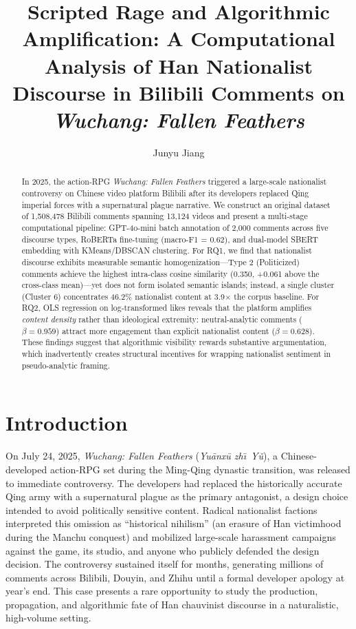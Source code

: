 \documentclass[letterpaper]{article}
\title{Scripted Rage and Algorithmic Amplification: A Computational Analysis of Han Nationalist Discourse in Bilibili Comments on \textit{Wuchang: Fallen Feathers}}
\author{
    Junyu Jiang
}
\begin{document}
\maketitle

\begin{abstract}
In 2025, the action-RPG \textit{Wuchang: Fallen Feathers} triggered a large-scale nationalist controversy on Chinese video platform Bilibili after its developers replaced Qing imperial forces with a supernatural plague narrative. We construct an original dataset of 1,508,478 Bilibili comments spanning 13,124 videos and present a multi-stage computational pipeline: GPT-4o-mini batch annotation of 2,000 comments across five discourse types, RoBERTa fine-tuning (macro-F1 = 0.62), and dual-model SBERT embedding with KMeans/DBSCAN clustering. For RQ1, we find that nationalist discourse exhibits measurable semantic homogenization—Type 2 (Politicized) comments achieve the highest intra-class cosine similarity (0.350, +0.061 above the cross-class mean)—yet does not form isolated semantic islands; instead, a single cluster (Cluster 6) concentrates 46.2\% nationalist content at 3.9$\times$ the corpus baseline. For RQ2, OLS regression on log-transformed likes reveals that the platform amplifies \textit{content density} rather than ideological extremity: neutral-analytic comments ($\beta = 0.959$) attract more engagement than explicit nationalist content ($\beta = 0.628$). These findings suggest that algorithmic visibility rewards substantive argumentation, which inadvertently creates structural incentives for wrapping nationalist sentiment in pseudo-analytic framing.
\end{abstract}

\section{Introduction}

On July 24, 2025, \textit{Wuchang: Fallen Feathers} (\textit{Yu\={a}nx\={u} zh\=\i\ Y\v{u}}), a Chinese-developed action-RPG set during the Ming-Qing dynastic transition, was released to immediate controversy. The developers had replaced the historically accurate Qing army with a supernatural plague as the primary antagonist, a design choice intended to avoid politically sensitive content. Radical nationalist factions interpreted this omission as ``historical nihilism'' (an erasure of Han victimhood during the Manchu conquest) and mobilized large-scale harassment campaigns against the game, its studio, and anyone who publicly defended the design decision. The controversy sustained itself for months, generating millions of comments across Bilibili, Douyin, and Zhihu until a formal developer apology at year's end. This case presents a rare opportunity to study the production, propagation, and algorithmic fate of Han chauvinist discourse in a naturalistic, high-volume setting.
\end{document}
